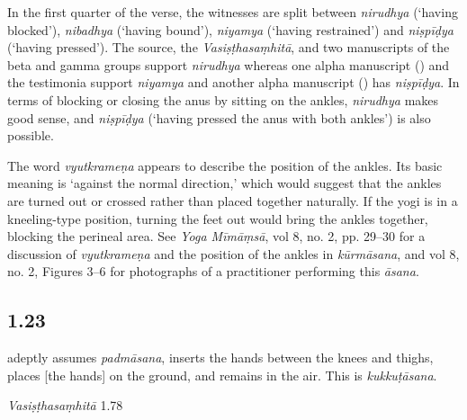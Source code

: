 \begin{ekdosis}
\begin{testimonia}[hp01_022]
\end{testimonia}

\begin{philcomm}[hp01_022]   
In the first quarter of the verse, the witnesses are split between \emph{nirudhya} (‘having blocked’), \emph{nibadhya} (‘having bound’), \emph{niyamya} (‘having restrained’) and \emph{niṣpīḍya} (‘having pressed’). The source, the \emph{Vasiṣṭhasaṃhitā}, and two manuscripts of the beta and gamma groups support \emph{nirudhya} whereas one alpha manuscript () and the testimonia support \emph{niyamya} and another alpha manuscript () has \emph{niṣpīḍya}. In terms of blocking or closing the anus by sitting on the ankles, \emph{nirudhya} makes good sense, and \emph{niṣpīḍya} (`having pressed the anus with both ankles') is also possible.  

The word \emph{vyutkrameṇa} appears to describe the position of the ankles. Its basic meaning is ‘against the normal direction,’ which would suggest that the ankles are turned out or crossed rather than placed together naturally. If the yogi is in a kneeling-type position, turning the feet out would bring the ankles together, blocking the perineal area. See \emph{Yoga Mīmāṃsā}, vol 8, no. 2, pp. 29–30 for a discussion of \emph{vyutkrameṇa} and the position of the ankles in \emph{kūrmāsana}, and vol 8, no. 2, Figures 3–6 for photographs of a practitioner performing this \emph{āsana}. 
\end{philcomm}

\subsection*{1.23}
\begin{translation} adeptly assumes \emph{padmāsana}, inserts the hands between the knees and thighs, places [the hands] on the ground, and remains in the air. This is \emph{kukkuṭāsana}.
\end{translation}

\begin{sources}[hp01_023]
\emph{Vasiṣṭhasaṃhitā} 1.78

\begin{versinnote}
\end{versinnote}


\end{sources}
\end{ekdosis}
